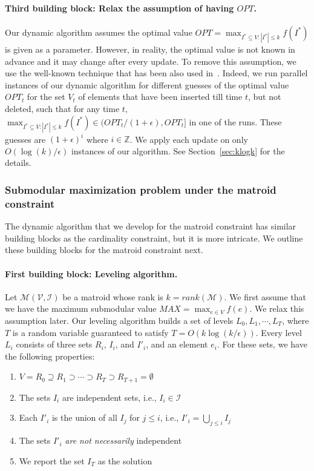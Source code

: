 \documentclass[11pt]{article}
\newcommand{\mO}{O}
\newcommand{\matroid}{\mathcal{M}(\ground,\mathcal{I})}
\newcommand{\ground}{\ensuremath{\mathcal{V}}}
\begin{document}
\paragraph{Third building block: Relax the assumption of having $OPT$.}
Our dynamic algorithm assumes the optimal value $OPT = \max_{I^* \subseteq V: |I^*| \le k} f(I^*)$ is given as a parameter.
However, in reality, the optimal value is not known in advance and it may change after every update. 
To remove this assumption, we use the well-known technique that has been also used in~\cite{DBLP:conf/nips/LattanziMNTZ20}.
Indeed, we run parallel instances of 
our dynamic algorithm for different guesses of the optimal value 
$OPT_t$ for the set $V_t$ of elements that have been inserted till time $t$, but not deleted, such that for any time $t$,
$\max_{I^* \subseteq V: |I^*| \le k} f(I^*) \in (OPT_t/(1+\epsilon), OPT_t]$ in one of the runs. 
These guesses are $(1+\epsilon)^i$ where $i\in \mathbb{Z}$. 
We apply each update on only $\mO(\log (k)/\epsilon)$ instances of our algorithm. 
See Section~\ref{sec:klogk} for the details. 





\subsubsection{Submodular maximization problem  under the matroid constraint} 
The dynamic algorithm that we develop for the matroid constraint has similar building blocks as 
the cardinality constraint, but it is more intricate. 
We outline these building blocks for the matroid constraint next. 



\paragraph{First building block: Leveling algorithm.}
Let $\matroid$ be a matroid whose rank is $k = rank(\mathcal{M})$. 
We first assume that we have the maximum submodular value $MAX = \max_{e \in V} f(e)$. 
We relax this assumption later. 
Our leveling algorithm builds a set of levels $L_0, L_1,\cdots,L_T$, where $T$ is 
a random variable guaranteed to satisfy $T = O(k\log(k/\epsilon))$. 
Every level $L_i$ consists of three sets $R_i$, $I_i$, and $I'_i$, 
and an element $e_i$. 
For these sets, we have the following properties: 
\begin{enumerate}
    \item $V=R_0 \supseteq R_1 \supset \cdots \supset R_T \supset R_{T + 1} = \emptyset$
    \item The sets $I_i$ are independent sets, i.e., $I_i \in \mathcal{I}$
    \item Each $I'_i$ is the union of all $I_{j}$ for $j \le i$, i.e., $I'_i = \bigcup_{j \le i} I_{j}$
    \item The sets $I'_i$ \emph{are not necessarily} independent
    \item We report the set $I_T$ as the solution
\end{enumerate}
\end{document}
